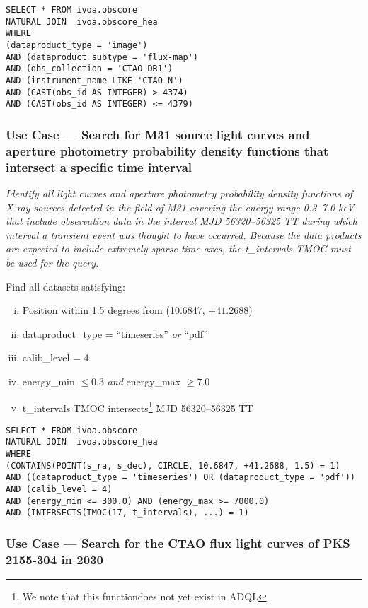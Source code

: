 \begin{verbatim}
SELECT * FROM ivoa.obscore
NATURAL JOIN  ivoa.obscore_hea
WHERE
(dataproduct_type = 'image')
AND (dataproduct_subtype = 'flux-map')
AND (obs_collection = 'CTAO-DR1')
AND (instrument_name LIKE 'CTAO-N')
AND (CAST(obs_id AS INTEGER) > 4374)
AND (CAST(obs_id AS INTEGER) <= 4379)
\end{verbatim}


\subsubsection{Use Case --- Search for M31 source light curves and aperture photometry probability density functions that intersect a specific time interval}

{\em Identify all light curves and aperture photometry probability density functions of X-ray sources detected in the field of M31 covering the energy range 0.3--7.0 keV that include observation data in the interval MJD 56320--56325 TT during which interval a transient event was thought to have occurred.  Because the data products are expected to include extremely sparse time axes, the t\_intervals TMOC must be used for the query.\/}

\medskip
\noindent Find all datasets satisfying:
\begin{enumerate}[(i)]
  \item Position within 1.5 degrees from (10.6847, $+41.2688$)
  \item dataproduct\_type = ``timeseries'' {\em or\/} ``pdf''
  \item calib\_level = 4
  \item energy\_min $\leq 0.3$ {\em and\/} energy\_max $\geq 7.0$
  \item t\_intervals TMOC intersects\footnote{We note that this functiondoes not yet exist in ADQL} MJD 56320--56325 TT
\end{enumerate}


\begin{verbatim}
SELECT * FROM ivoa.obscore
NATURAL JOIN  ivoa.obscore_hea
WHERE
(CONTAINS(POINT(s_ra, s_dec), CIRCLE, 10.6847, +41.2688, 1.5) = 1)
AND ((dataproduct_type = 'timeseries') OR (dataproduct_type = 'pdf'))
AND (calib_level = 4)
AND (energy_min <= 300.0) AND (energy_max >= 7000.0)
AND (INTERSECTS(TMOC(17, t_intervals), ...) = 1)
\end{verbatim}

\subsubsection{Use Case --- Search for the CTAO flux light curves of PKS 2155-304 in 2030}

